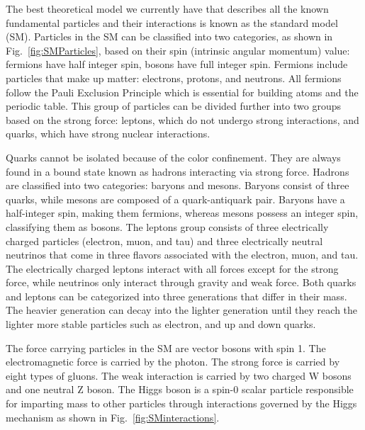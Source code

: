 
The best theoretical model we currently have that describes all the known fundamental particles and their interactions is known as the standard model (SM).
Particles in the SM can be classified into two categories, as shown in Fig.~\ref{fig:SMParticles}, based on their spin (intrinsic angular momentum) value: fermions have half integer spin, bosons have full integer spin.
Fermions include particles that make up matter: electrons, protons, and neutrons. All fermions follow the Pauli Exclusion Principle which is essential for building atoms and the periodic table.
This group of particles can be divided further into two groups based on the strong force: leptons, which do not undergo strong interactions, and quarks, which have strong nuclear interactions.

Quarks cannot be isolated because of the color confinement. They are always found in a bound state known as hadrons interacting via strong force.
Hadrons are classified into two categories: baryons and mesons.
Baryons consist of three quarks, while mesons are composed of a quark-antiquark pair.
Baryons have a half-integer spin, making them fermions, whereas mesons possess an integer spin, classifying them as bosons.
The leptons group consists of three electrically charged particles (electron, muon, and tau) and three electrically neutral neutrinos that come in three flavors associated with the electron, muon, and tau.
The electrically charged leptons interact with all forces except for the strong force, while neutrinos only interact through gravity and weak force.
Both quarks and leptons can be categorized into
three generations that differ in their mass.
The heavier generation can decay into the lighter generation
until they reach the lighter more stable particles such as electron, and up and down quarks.

The force carrying particles in the SM are vector bosons with spin 1.
The electromagnetic force is carried by the photon.
The strong force is carried by eight types of gluons.
The weak interaction is carried by two charged W bosons and one neutral Z boson.
The Higgs boson is a spin-0 scalar particle responsible for imparting mass to other particles through interactions governed by the Higgs mechanism as shown in Fig.~\ref{fig:SMinteractions}.

